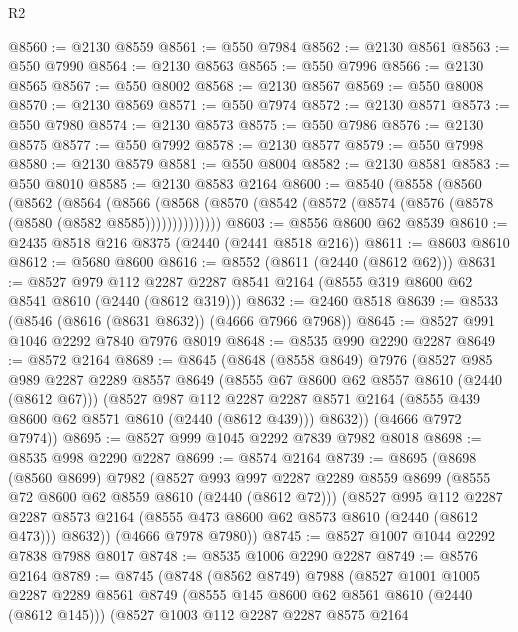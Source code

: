 \begin{lexlean}{R2}
\begin{coremodule}
@8560 := @2130 @8559
@8561 := @550 @7984
@8562 := @2130 @8561
@8563 := @550 @7990
@8564 := @2130 @8563
@8565 := @550 @7996
@8566 := @2130 @8565
@8567 := @550 @8002
@8568 := @2130 @8567
@8569 := @550 @8008
@8570 := @2130 @8569
@8571 := @550 @7974
@8572 := @2130 @8571
@8573 := @550 @7980
@8574 := @2130 @8573
@8575 := @550 @7986
@8576 := @2130 @8575
@8577 := @550 @7992
@8578 := @2130 @8577
@8579 := @550 @7998
@8580 := @2130 @8579
@8581 := @550 @8004
@8582 := @2130 @8581
@8583 := @550 @8010
@8585 := @2130 @8583 @2164
@8600 := @8540
    (@8558
      (@8560
        (@8562
          (@8564
            (@8566
              (@8568 (@8570 (@8542 (@8572 (@8574 (@8576 (@8578 (@8580 (@8582 @8585))))))))))))))
@8603 := @8556 @8600 @62 @8539
@8610 := @2435 @8518 @216 @8375 (@2440 (@2441 @8518 @216))
@8611 := @8603 @8610
@8612 := @5680 @8600
@8616 := @8552 (@8611 (@2440 (@8612 @62)))
@8631 := @8527
    @979
    @112
    @2287
    @2287
    @8541
    @2164
    (@8555 @319 @8600 @62 @8541 @8610 (@2440 (@8612 @319)))
@8632 := @2460 @8518
@8639 := @8533 (@8546 (@8616 (@8631 @8632)) (@4666 @7966 @7968))
@8645 := @8527 @991 @1046 @2292 @7840 @7976 @8019
@8648 := @8535 @990 @2290 @2287
@8649 := @8572 @2164
@8689 := @8645
    (@8648
      (@8558 @8649)
      @7976
      (@8527
        @985
        @989
        @2287
        @2289
        @8557
        @8649
        (@8555 @67 @8600 @62 @8557 @8610 (@2440 (@8612 @67)))
        (@8527
          @987
          @112
          @2287
          @2287
          @8571
          @2164
          (@8555 @439 @8600 @62 @8571 @8610 (@2440 (@8612 @439)))
          @8632))
      (@4666 @7972 @7974))
@8695 := @8527 @999 @1045 @2292 @7839 @7982 @8018
@8698 := @8535 @998 @2290 @2287
@8699 := @8574 @2164
@8739 := @8695
    (@8698
      (@8560 @8699)
      @7982
      (@8527
        @993
        @997
        @2287
        @2289
        @8559
        @8699
        (@8555 @72 @8600 @62 @8559 @8610 (@2440 (@8612 @72)))
        (@8527
          @995
          @112
          @2287
          @2287
          @8573
          @2164
          (@8555 @473 @8600 @62 @8573 @8610 (@2440 (@8612 @473)))
          @8632))
      (@4666 @7978 @7980))
@8745 := @8527 @1007 @1044 @2292 @7838 @7988 @8017
@8748 := @8535 @1006 @2290 @2287
@8749 := @8576 @2164
@8789 := @8745
    (@8748
      (@8562 @8749)
      @7988
      (@8527
        @1001
        @1005
        @2287
        @2289
        @8561
        @8749
        (@8555 @145 @8600 @62 @8561 @8610 (@2440 (@8612 @145)))
        (@8527
          @1003
          @112
          @2287
          @2287
          @8575
          @2164

\end{coremodule}
\end{lexlean}
